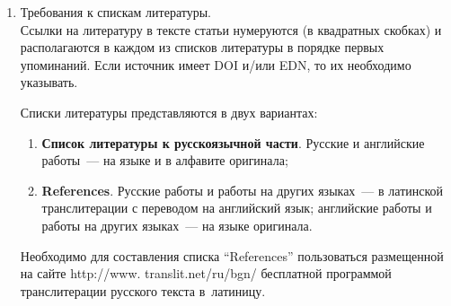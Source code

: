 {\begin{enumerate}[1.]
\begin{itemize}
{\sf http://www.ipiran.ru/journal/issues/2013\_07\_01\_eng/authors.asp};
\item аннотация (не менее 100~слов на каждом из языков). Аннотация~--- это краткое
резюме работы, которое может публиковаться отдельно. Она является основным
источником информации в~ин\-фор\-ма\-ци\-он\-ных системах и базах данных. Английская
аннотация должна быть оригинальной, может не быть дословным переводом русского
текста и должна быть написана хорошим английским языком. В~аннотации не должно
быть ссылок на литературу и, по возможности, формул;\\[-15pt]
\item ключевые слова~--- желательно из принятых в мировой
на\-уч\-но-тех\-ни\-че\-ской литературе тематических тезаурусов. Предложения не
могут быть ключевыми словами;\\[-15pt]
\item источники финансирования работы (ссылки на гранты, проекты,
поддерживающие организации и~т.\,п.).
\end{itemize}




\item  Требования к спискам литературы.\\[-14pt]

Ссылки на литературу в тексте статьи нумеруются (в квадратных скобках) и
располагаются в каждом из списков литературы в порядке  первых упоминаний. Если источник имеет DOI и/или EDN,
то их необходимо указывать.

Списки литературы представляются в двух вариантах:\\[-14pt]


\noindent
\begin{enumerate}[(1)]
\item \textbf{Список литературы к русскоязычной части}. Русские и английские
работы~---  на языке и в алфавите оригинала;\\[-14.5pt]
\item  \textbf{References}. Русские работы и работы на других языках~--- в латинской
транслитерации с переводом на английский язык; английские работы и работы на других
языках~--- на языке оригинала.
\end{enumerate}

Необходимо для составления списка ``References'' пользоваться размещенной на сайте
{\sf http://www. translit.net/ru/bgn/} бесплатной программой транслитерации русского
 текста в~латиницу. %


\end{enumerate}}
